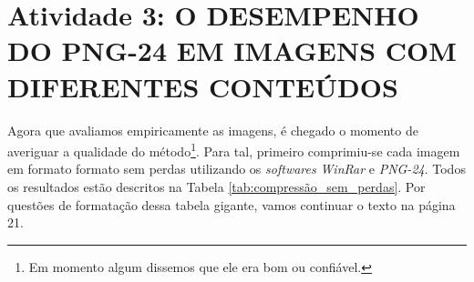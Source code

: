 \captionsetup{justification=centering,margin=0cm}
\label{cap:atividade3}  %

\chapter[Atividade 3: O DESEMPENHO DO PNG-24 EM IMAGENS COM DIFERENTES CONTEÚDOS]{Atividade 3: O DESEMPENHO DO PNG-24 EM IMAGENS COM DIFERENTES CONTEÚDOS}

Agora que avaliamos empiricamente as imagens, é chegado o momento de averiguar a qualidade do método\footnote{Em momento algum dissemos que ele era bom ou confiável.}. Para tal, primeiro comprimiu-se cada imagem em formato formato sem perdas utilizando os \textit{softwares} \textit{WinRar} e \textit{PNG-24}. Todos os resultados estão descritos na Tabela \ref{tab:compressão_sem_perdas}. Por questões de formatação dessa tabela gigante, vamos continuar o texto na página 21. 

